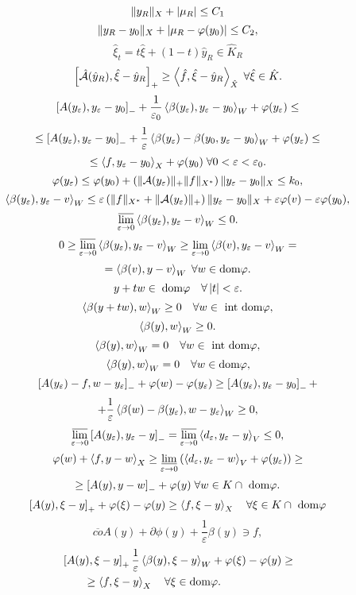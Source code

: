 \documentclass[12pt]{book} %
\let\epsilon\varepsilon
\begin{document}
\[\|y_R\|_X+\left|\mu_R\right|\leq C_1\]
\[\|y_R-y_0\|_X+\left|\mu_R-\varphi(y_0)\right|\leq C_2,\]
\[\hat{\xi}_t=t\hat{\xi}+(1-t)\hat{y}_R\in\hat{K}_R\]
\[\left[\hat{\mathcal{A}}(\hat{y}_R),\hat{\xi}-\hat{y}_R\right]_+\geq\left<\hat{f},\hat{\xi}-\hat{y}_R\right>_{\hat{X}}\;\forall\hat{\xi}\in\hat{K}.\]
\[\mysbra{A(y_\epsilon),y_\epsilon-y_0}_-+\frac{1}{\epsilon_0}\mysca{\beta(y_\epsilon)}{y_\epsilon-y_0}_W+\phi(y_\epsilon)\leq\]
\[\leq\mysbra{A(y_\epsilon),y_\epsilon-y_0}_-+\frac{1}{\epsilon}\mysca{\beta(y_\epsilon)-\beta(y_0}{y_\epsilon-y_0}_W+\phi(y_\epsilon)\leq\]
\[\leq\mysca{f}{y_\epsilon-y_0}_X+\phi(y_0)\;\forall0<\epsilon<\epsilon_0.\]
\[\phi(y_\epsilon)\leq\phi(y_0)+\mybra{\mynorm{\mathcal{A}(y_\epsilon)}_+\mynorm{f}_{X^*}}\mynorm{y_\epsilon-y_0}_{X}\leq k_0,\]
\[\mysca{\beta(y_\epsilon)}{y_\epsilon-v}_W\leq\epsilon\mybra{\mynorm{f}_{X^*}+\mynorm{\mathcal{A}(y_\epsilon)}_+}\mynorm{y_\epsilon-y_0}_X+\epsilon
\phi(v)-\epsilon\phi(y_0),\]
\[\varlimsup_{\epsilon\to0}\mysca{\beta(y_\epsilon)}{y_\epsilon-v}_W\leq0.\]
\[0\geq\varlimsup_{\epsilon\to0}\mysca{\beta(y_\epsilon)}{y_\epsilon-v}_W\geq\lim_{\epsilon\to0}\mysca{\beta(v)}{y_\epsilon-v}_W=\]
\[=\left<\beta(v),y-v\right>_W\;\forall w\in\mbox{dom}\varphi.\]
\[y+tw\in\;\mbox{dom}\phi\quad\forall\myabs{t}<\epsilon.\]
\[\left<\beta(y+tw),w\right>_W\geq0\quad\forall w\in\mbox{ int dom}\varphi,\]
\[\left<\beta(y),w\right>_W\geq0.\]
\[\left<\beta(y),w\right>_W=0\quad\forall w\in\mbox{ int dom}\varphi,\]
\[\left<\beta(y),w\right>_W=0\quad\forall w\in\mbox{dom}\varphi,\]
\[\mysbra{A(y_\epsilon)-f,w-y_\epsilon}_-+\phi(w)-\phi(y_\epsilon)\geq\mysbra{A(y_\epsilon),y_\epsilon-y_0}_-+\]
\[+\frac{1}{\epsilon}\mysca{\beta(w)-\beta(y_\epsilon)}{w-y_\epsilon}_W\geq0,\]
\[\varlimsup_{\epsilon\to0}\mysbra{A(y_\epsilon),y_\epsilon-y}_-=\varlimsup_{\epsilon\to0}\mysca{d_\epsilon}{y_\epsilon-y}_V\leq0,\]
\[\phi(w)+\mysca{f}{y-w}_X\geq\varliminf_{\epsilon\to0}\mybra{\mysca{d_\epsilon}{y_\epsilon-w}_V+\phi(y_\epsilon)}\geq\]
\[\geq\left[A(y),y-w\right]_-+\varphi(y)\;\forall w\in K\cap\mbox{ dom}\varphi.\]
\begin{equation}\left[A(y),\xi-y\right]_++\varphi(\xi)-\varphi(y)\geq\left<f,\xi-y\right>_X\quad\forall \xi\in K\cap\mbox{ dom}\varphi\end{equation}
\begin{equation}\overline{co}A(y)+\partial\phi(y)+\frac{1}{\epsilon}\beta(y)\ni f,\end{equation}
\begin{equation}\begin{aligned}
	&\mysbra{A(y),\xi-y}_+\frac{1}{\epsilon}\mysca{\beta(y)}{\xi-y}_W+\phi(\xi)-\phi(y)\geq\\
	&\qquad\geq\mysca{f}{\xi-y}_X\quad\forall\xi\in\mbox{dom}\phi.
\end{aligned}\end{equation}
\end{document}
